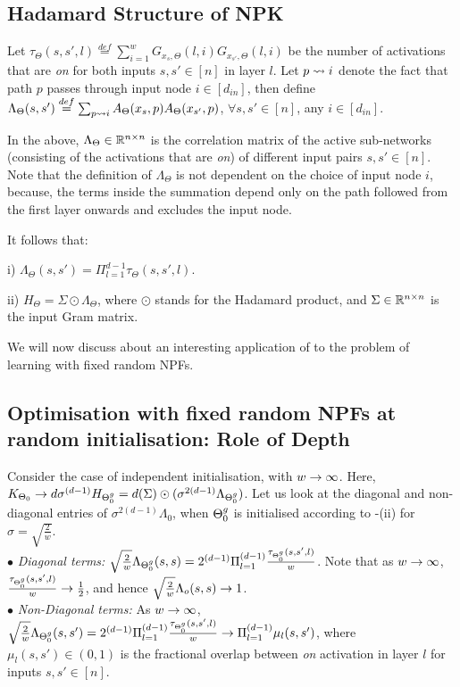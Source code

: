 \subsection{Hadamard Structure of NPK}
\begin{definition}\label{def:lambda}
Let $\tau_{\Theta}(s,s',l)\stackrel{def}=\sum_{i=1}^w G_{x_s,\Theta}(l,i)G_{x_{s'},\Theta}(l,i)$ be the number of activations that are \emph{on} for both inputs $s,s'\in[n]$ in layer $l$. Let $p\rightsquigarrow i$ denote the fact that path $p$ passes through input node $i\in[d_{in}]$, then define $\Lambda_{\Theta}(s,s')\stackrel{def}{=}\sum_{p\rightsquigarrow i} A_{\Theta}(x_s,p) A_{\Theta}(x_{s'},p)$, $\forall s,s'\in[n]$, any $i\in [d_{in}]$.
\end{definition}
In the  above, $\Lambda_{\Theta}\in\mathbb{R}^{n\times n}$ is the correlation matrix of the active sub-networks (consisting of the activations that are \emph{on}) of different input pairs $s,s'\in[n]$. Note that the definition of $\Lambda_{\Theta}$ is not dependent on the choice of input node $i$, because, the terms inside the summation depend only on the path followed from the first layer onwards and excludes the input node.

\begin{lemma}\label{lm:npk}
It follows that:

i) $\Lambda_{\Theta}(s,s')=\Pi_{l=1}^{d-1}\tau_{\Theta}(s,s',l)$.

ii) $H_{\Theta}= \Sigma\odot\Lambda_{\Theta}$, where $\odot$ stands for the Hadamard product, and $\Sigma \in \mathbb{R}^{n\times n}$ is the input Gram matrix.
\end{lemma}


We will now discuss about an interesting application of  to the problem of learning with fixed random NPFs.
\subsection{Optimisation with fixed random NPFs at random initialisation: Role of Depth}
Consider the case of independent initialisation, with $w\rightarrow\infty$. Here, $K_{\Theta_0}\rightarrow d\sigma^{(d-1)}H_{{\Theta}^g_0}=d(\Sigma)\odot(\sigma^{2(d-1)}\Lambda_{{\Theta}^g_0})$. Let us look at the diagonal and non-diagonal entries of $\sigma^{2(d-1)}\Lambda_0$, when ${\Theta}^g_0$ is initialised according to -(ii) for $\sigma=\sqrt{\frac2w}$.\\
$\bullet$ \emph{Diagonal terms:} $\sqrt{\frac2w}\Lambda_{{\Theta}^g_0}(s,s)=2^{(d-1)}\Pi_{l=1}^{(d-1)}\frac{\tau_{{\Theta}^g_0}(s,s',l)}w$. Note that as $w\rightarrow\infty$, $\frac{\tau_{{\Theta}^g_0}(s,s',l)}w\rightarrow\frac12$, and hence $\sqrt{\frac2w}\Lambda_o(s,s)\rightarrow 1$.\\
$\bullet$ \emph{Non-Diagonal terms:} As $w\rightarrow\infty$, $\sqrt{\frac2w}\Lambda_{{\Theta}^g_0}(s,s')=2^{(d-1)}\Pi_{l=1}^{(d-1)}\frac{\tau_{{\Theta}^g_0}(s,s',l)}w\rightarrow \Pi_{l=1}^{(d-1)}\mu_l(s,s')$, where $\mu_l(s,s')\in(0,1)$ is the fractional overlap between \emph{on} activation in layer $l$ for inputs $s,s'\in[n]$. 

